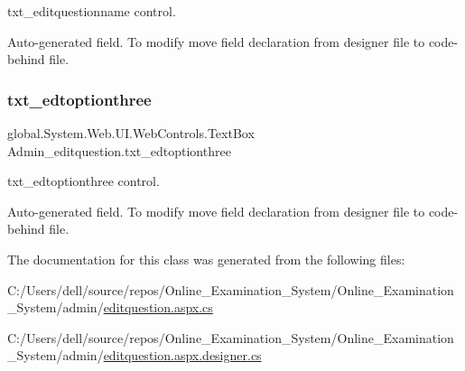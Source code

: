 txt\+\_\+editquestionname control. 

Auto-\/generated field. To modify move field declaration from designer file to code-\/behind file. \mbox{\label{class_admin__editquestion_a1bb8c99813f44dbb8f1c3ee9b961de63}} 
\subsubsection{\texorpdfstring{txt\_edtoptionthree}{txt\_edtoptionthree}}
{\footnotesize\ttfamily global.\+System.\+Web.\+U\+I.\+Web\+Controls.\+Text\+Box Admin\+\_\+editquestion.\+txt\+\_\+edtoptionthree\hspace{0.3cm}{\ttfamily [protected]}}



txt\+\_\+edtoptionthree control. 

Auto-\/generated field. To modify move field declaration from designer file to code-\/behind file. 

The documentation for this class was generated from the following files\+:\begin{DoxyCompactItemize}
\item 
C\+:/\+Users/dell/source/repos/\+Online\+\_\+\+Examination\+\_\+\+System/\+Online\+\_\+\+Examination\+\_\+\+System/admin/\mbox{\hyperlink{editquestion_8aspx_8cs}{editquestion.\+aspx.\+cs}}\item 
C\+:/\+Users/dell/source/repos/\+Online\+\_\+\+Examination\+\_\+\+System/\+Online\+\_\+\+Examination\+\_\+\+System/admin/\mbox{\hyperlink{editquestion_8aspx_8designer_8cs}{editquestion.\+aspx.\+designer.\+cs}}\end{DoxyCompactItemize}
